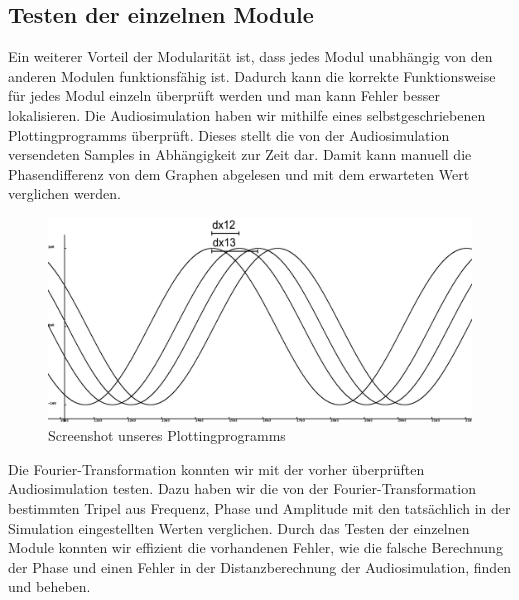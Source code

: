 \subsection{Testen der einzelnen Module}
Ein weiterer Vorteil der Modularität ist, dass jedes Modul unabhängig von den anderen Modulen funktionsfähig ist. Dadurch kann die korrekte Funktionsweise für jedes Modul einzeln überprüft werden und man kann Fehler besser lokalisieren.
Die Audiosimulation haben wir mithilfe eines selbstgeschriebenen Plottingprogramms überprüft. Dieses stellt die von der Audiosimulation versendeten Samples in Abhängigkeit zur Zeit dar. Damit kann manuell die Phasendifferenz von dem Graphen abgelesen und mit dem erwarteten Wert verglichen werden.
\begin{figure} [H]
  \centering
  \includegraphics[width=.8\linewidth]{img/glplot}
  \caption{Screenshot unseres Plottingprogramms}
  \label{fig:glplot}
\end{figure}
\pagebreak
Die Fourier-Transformation konnten wir mit der vorher überprüften Audiosimulation testen. Dazu haben wir die von der Fourier-Transformation bestimmten Tripel aus Frequenz, Phase und Amplitude mit den tatsächlich in der Simulation eingestellten Werten verglichen.
Durch das Testen der einzelnen Module konnten wir effizient die vorhandenen Fehler, wie die falsche Berechnung der Phase und einen Fehler in der Distanzberechnung der Audiosimulation, finden und beheben.

